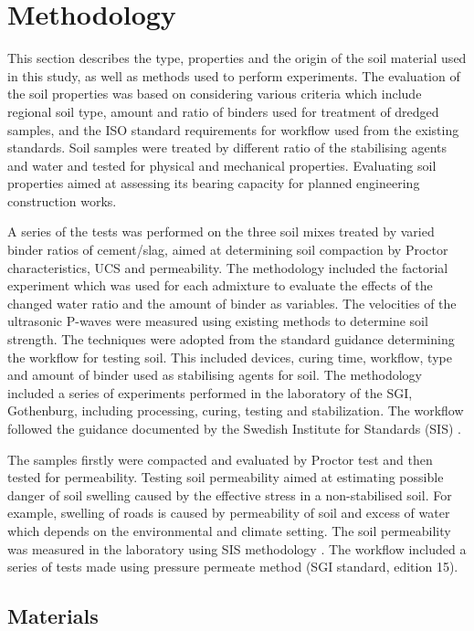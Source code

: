\documentclass{amestyle}
\begin{document}

\section{Methodology}
This section describes the type, properties and the origin of the soil material used in this study, as well as methods used to perform experiments. The evaluation of the soil properties was based on considering various criteria which include regional soil type, amount and ratio of binders used for treatment of dredged samples, and the ISO standard requirements for workflow used from the existing standards. Soil samples were treated by different ratio of the stabilising agents and water and tested for physical and mechanical properties. Evaluating soil properties aimed at assessing its bearing capacity for planned engineering construction works.

A series of the tests was performed on the three soil mixes treated by varied binder ratios of cement/slag, aimed at determining soil compaction by Proctor characteristics, UCS and permeability. The methodology included the factorial experiment which was used for each admixture to evaluate the effects of the changed water ratio and the amount of binder as variables. The velocities of the ultrasonic P-waves were measured using existing methods \cite{Lindh202102} to determine soil strength. The techniques were adopted from the standard guidance determining the workflow for testing soil. This included devices, curing time, workflow, type and amount of binder used as stabilising agents for soil. The methodology included a series of experiments performed  in the laboratory of the SGI, Gothenburg, including processing, curing, testing and stabilization. The workflow followed the guidance documented by the Swedish Institute for Standards (SIS) \cite{SIS2017,SIS2018,SIS2019}. 

The samples firstly were compacted and evaluated by Proctor test and then tested for permeability. Testing soil permeability aimed at estimating possible danger of soil swelling caused by the effective stress in a non-stabilised soil. For example, swelling of roads is caused by permeability of soil and excess of water which depends on the environmental and climate setting. The soil permeability was measured in the laboratory using SIS methodology \cite{SIS2019}. The workflow included a series of tests made using pressure permeate method (SGI standard, edition 15).

\subsection{Materials}
\end{document}
